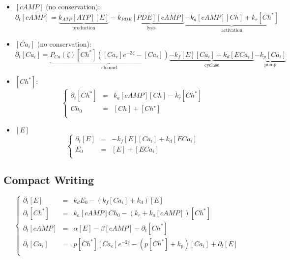 \documentclass[aps,12pt]{revtex4}
\begin{document}
\begin{itemize}
\item $[cAMP]$ (no conservation):
	\begin{equation}
	\partial_t [cAMP] = \underbrace{k_{ATP} [ATP] [E]}_{\text{production}} 
	- \underbrace{k_{PDE} [PDE] [cAMP]}_{\text{lysis}}
	\underbrace{-k_a [cAMP][Ch] + k_r [Ch^\ast]}_{\text{activation}}
	\end{equation}
	
\item $[Ca_i]$ (no conservation):
	\begin{equation}
		\partial_t [Ca_i] = 
		\underbrace{P_{Ca}(\zeta) [Ch^\ast] ([Ca_e]e^{-2\zeta}-[Ca_i])}_{\text{channel}}
		\underbrace{ - k_f [E] [Ca_i]  + k_d [ECa_i] }_{\text{cyclase}}
		\underbrace{-k_p [Ca_i]}_{\text{pump}}
	\end{equation}
	
\item $[Ch^\ast]$:
	\begin{equation}
	\left\lbrace
	\begin{array}{rcl}
		\partial_t[Ch^\ast] &= &k_a [cAMP][Ch] - k_r [Ch^\ast]\\
	 		Ch_0 & = & [Ch] + [Ch^\star]\\
	\end{array}
	\right.
	\end{equation}
	
\item $[E]$
	\begin{equation}
	\left\lbrace
	\begin{array}{rcl}
		\partial_t [E] & = & - k_f [E] [Ca_i]  + k_d [ECa_i]\\
		E_0 & = & [E] + [ECa_i]\\
	\end{array}
	\right.
	\end{equation}
\end{itemize}

\subsection{Compact Writing}

\begin{equation}
\left\lbrace
\begin{array}{lcl}
\partial_t [E] & = & k_d E_0 - (k_f[Ca_i]+k_d)[E]\\
\partial_t [Ch^\ast] & = & k_a [cAMP] Ch_0 - (k_r+k_a[cAMP]) [Ch^\ast]\\
\partial_t [cAMP]    & = & \alpha [E] - \beta [cAMP] - \partial_t [Ch^\ast] \\
\partial_t [Ca_i]    & = & p [Ch^\ast] [Ca_e] e^{-2\zeta}  - (p[Ch^\ast]+k_p) [Ca_i] + \partial_t [E]\\
\end{array}
\right.
\end{equation}
\end{document}
